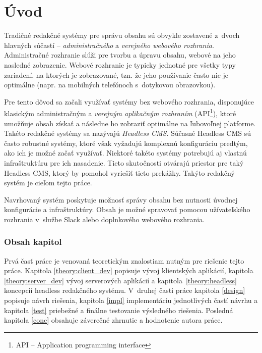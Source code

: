 \chapter{Úvod}
Tradičné redakčné systémy pre správu obsahu sú obvykle zostavené z~dvoch hlavných súčastí -- \emph{administračného} a \emph{verejného webového rozhrania}. Administračné rozhranie slúži pre tvorbu a úpravu obsahu, webové na jeho nasledné zobrazenie. Webové rozhranie je typicky jednotné pre všetky typy zariadení, na ktorých je zobrazované, tzn. že jeho používanie často nie je optimálne (napr. na mobilných telefónoch s~dotykovou obrazovkou).

Pre tento dôvod sa začali využívať systémy bez webového rozhrania, disponujúce klasickým administračným a \emph{verejným aplikačným rozhraním} (API\footnote{API -- Application programming interface}), ktoré umožňuje obsah získať a následne ho zobraziť optimálne na ľubovoľnej platforme. Takéto redakčné systémy sa nazývajú \emph{Headless CMS}. Súčasné Headless CMS sú často robustné systémy, ktoré však vyžadujú komplexnú konfiguráciu predtým, ako ich je možné začať využívať. Niektoré takéto systémy potrebujú aj vlastnú infraštruktúru pre ich nasadenie. Tieto skutočnosti otvárajú priestor pre taký Headless CMS, ktorý by pomohol vyriešiť tieto prekážky. Takýto redakčný systém je cieľom tejto práce.

Navrhovaný systém poskytuje možnosť správy obsahu bez nutnosti úvodnej konfigurácie a infraštruktúry. Obsah je možné spravovať pomocou užívateľského rozhrania v~službe Slack alebo doplnkového webového rozhrania.

\subsection*{Obsah kapitol}
Prvá časť práce je venovaná teoretickým znalostiam nutným pre riešenie tejto práce. Kapitola \ref{theory:client_dev} popisuje vývoj klientských aplikácií, kapitola \ref{theory:server_dev} vývoj serverových aplikácií a kapitola~\ref{theory:headless} koncepcií headless redakčného systému. V~druhej časti práce kapitola \ref{design} popisuje návrh riešenia, kapitola \ref{impl} implementáciu jednotlivých častí návrhu a kapitola \ref{test} priebežné a finálne testovanie výsledného riešenia. Posledná kapitola \ref{conc} obsahuje záverečné zhrnutie a hodnotenie autora práce.

